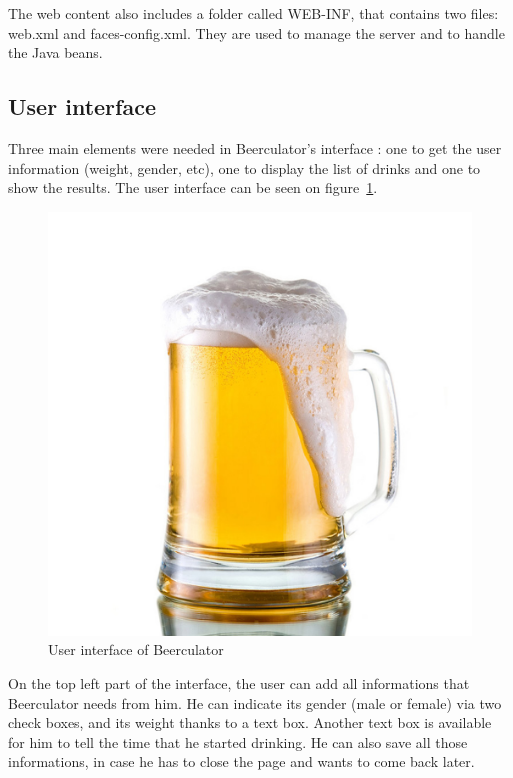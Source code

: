 The web content also includes a folder called WEB-INF, that contains two files: web.xml and faces-config.xml. They are used to manage the server and to handle the Java beans.

\subsection{User interface}
\label{ssec:ui}

Three main elements were needed in Beerculator's interface : one to get the user information (weight, gender, etc), one to display the list of drinks and one to show the results. The user interface can be seen on {\sc figure}~\ref{fig:ui}.\\

\begin{figure}[H]
\centering
   \includegraphics[scale=0.3]{./figures/beer.jpg}
   \caption{User interface of Beerculator}
   \label{fig:ui}
\end{figure}

On the top left part of the interface, the user can add all informations that Beerculator needs from him. He can indicate its gender (male or female) via two check boxes, and its weight thanks to a text box. Another text box is available for him to tell the time that he started drinking. He can also save all those informations, in case he has to close the page and wants to come back later.\\


